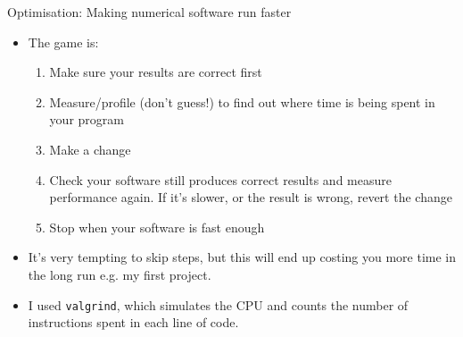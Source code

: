 \documentclass{beamer}
\begin{document}
\begin{frame}{Optimisation: Making numerical software run faster}
\begin{itemize}
\item The game is: 
\begin{enumerate}
\item Make sure your results are correct first
\item Measure/profile (don't guess!) to find out where time is being spent in your program
\item Make a change
\item Check your software still produces correct results and measure performance again. If it's slower, or the result is wrong, revert the change
\item Stop when your software is fast enough
\end{enumerate}
\item It's very tempting to skip steps, but this will end up costing you more time in the long run e.g.
		my first project.
\item I used \texttt{valgrind}, which simulates the CPU and counts the number of instructions spent in each
	  line of code. \end{itemize}
\end{frame}
\end{document}
